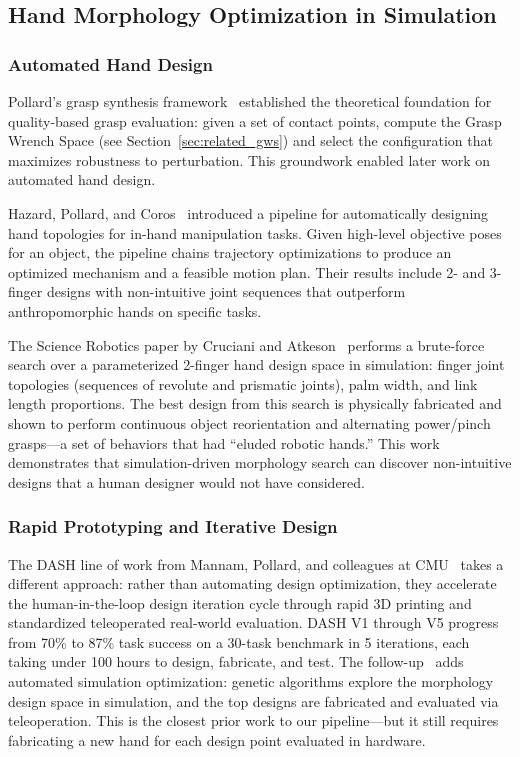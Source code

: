\documentclass[journal]{IEEEtran}
\begin{document}
\subsection{Hand Morphology Optimization in Simulation}
\label{sec:related_morphopt}

\subsubsection{Automated Hand Design}

Pollard's grasp synthesis framework~\cite{pollard2004grasp} established the theoretical
foundation for quality-based grasp evaluation: given a set of contact points, compute
the Grasp Wrench Space (see Section~\ref{sec:related_gws}) and select the configuration
that maximizes robustness to perturbation.
This groundwork enabled later work on automated hand design.

Hazard, Pollard, and Coros~\cite{hazard2020automated} introduced a pipeline for
automatically designing hand topologies for in-hand manipulation tasks.
Given high-level objective poses for an object, the pipeline chains trajectory
optimizations to produce an optimized mechanism and a feasible motion plan.
Their results include 2- and 3-finger designs with non-intuitive joint sequences that
outperform anthropomorphic hands on specific tasks.

The Science Robotics paper by Cruciani and Atkeson~\cite{pollard2021complex}
performs a brute-force search over a parameterized 2-finger hand design space in simulation:
finger joint topologies (sequences of revolute and prismatic joints), palm width, and
link length proportions.
The best design from this search is physically fabricated and shown to perform continuous
object reorientation and alternating power/pinch grasps---a set of behaviors that had
``eluded robotic hands.''
This work demonstrates that simulation-driven morphology search can discover non-intuitive
designs that a human designer would not have considered.

\subsubsection{Rapid Prototyping and Iterative Design}

The DASH line of work from Mannam, Pollard, and colleagues at CMU~\cite{mannam2023dash}
takes a different approach: rather than automating design optimization, they accelerate
the human-in-the-loop design iteration cycle through rapid 3D printing and standardized
teleoperated real-world evaluation.
DASH V1 through V5 progress from 70\% to 87\% task success on a 30-task benchmark in
5 iterations, each taking under 100 hours to design, fabricate, and test.
The follow-up~\cite{mannam2024codesign} adds automated simulation optimization: genetic
algorithms explore the morphology design space in simulation, and the top designs are
fabricated and evaluated via teleoperation.
This is the closest prior work to our pipeline---but it still requires fabricating a
new hand for each design point evaluated in hardware.
\end{document}
